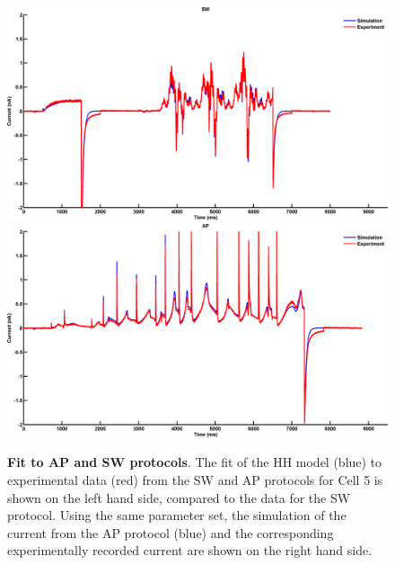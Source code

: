 \documentclass[11pt,a4paper,oneside]{article}
\begin{document}
\begin{figure}[hb]
\begin{center}
\includegraphics[scale=0.42]{Figures/Fig_hh_16713110_FP_ap_sine_wave_CP_sine_wave.png}
\includegraphics[scale=0.42]{Figures/Fig_hh_16713110_FP_ap_sine_wave_CP_ap.png}
\caption{\textbf{Fit to AP and SW protocols}. The fit of the HH model (blue) to experimental data (red) from the SW and AP protocols for Cell 5 is shown on the left hand side, compared to the data for the SW protocol. Using the same parameter set, the simulation of the current from the AP protocol (blue) and the corresponding experimentally recorded current are shown on the right hand side.} 
\label{Fig_AP_SWfit}
\end{center}
\end{figure}
\end{document}
